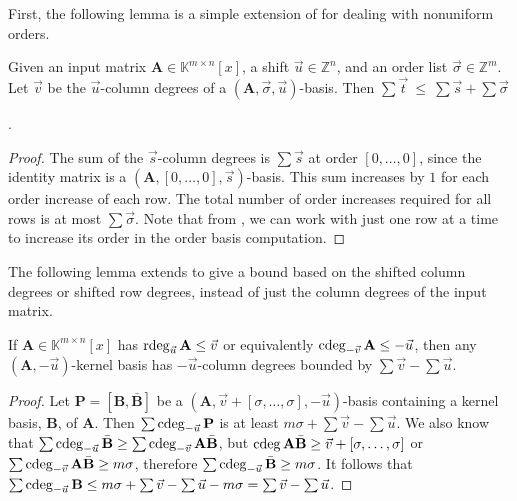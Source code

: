First, the following lemma is a simple extension of 
for dealing with nonuniform orders.
\begin{lem}
\label{lem:boundOfSumOfShiftedDegreesOfOrderBasisWithNonuniformOrder}Given
an input matrix $\mathbf{A}\in\mathbb{K}^{m\times n}[x]$, a shift
$\vec{u}\in\mathbb{Z}^{n}$, and an order list $\vec{\sigma}\in\mathbb{Z}^{m}$.
Let $\vec{v}$ be the $\vec{u}$-column degrees of a $\left(\mathbf{A},\vec{\sigma},\vec{u}\right)$-basis.
Then $\sum\vec{t}~\le~\sum\vec{s}+\sum\vec{\sigma}$%
\begin{comment}
 and $\max_{i}\left(\vec{t}_{i}-\vec{s}_{i}\right)\le\sigma$
\end{comment}
\textup{}%
\begin{comment}
need to permute the columns to put the pivots on the diagonal.
\end{comment}
. \end{lem}
\begin{proof}
\begin{comment}
For example, for a input matrix with two rows, instead of increasing
the order of both rows to $\left[1,1\right]$ at once, we can work
on the second row first to increase the order to $\left[0,1\right]$,
and then compute to order $\left[1,1\right]$.  
\end{comment}
The sum of the $\vec{s}$-column degrees is $\sum\vec{s}$ at order
$\left[0,\dots,0\right]$, since the identity matrix is a $\left(\mathbf{A},\left[0,\dots,0\right],\vec{s}\right)$-basis.
This sum increases by $1$ for each order increase of each row. The
total number of order increases required for all rows is at most $\sum\vec{\sigma}$.
Note that from , we can work with
just one row at a time to increase its order in the order basis computation. 
\end{proof}
The following lemma extends 
to give a bound based on the shifted column degrees or shifted row
degrees, instead of just the column degrees of the input matrix.
\begin{lem}
\label{lem:generaKernelBasisDegreeBound}If $\mathbf{A}\in\mathbb{K}^{m\times n}[x]$
has $\rdeg_{\vec{u}}\mathbf{A}\le\vec{v}$ or equivalently $\cdeg_{-\vec{v}}\mathbf{A}\le-\vec{u}$,
then any $(\mathbf{A},-\vec{u})$-kernel basis has $-\vec{u}$-column
degrees bounded by $\sum\vec{v}-\sum\vec{u}$. \end{lem}
\begin{proof}
Let $\mathbf{P}=\left[\mathbf{B},\bar{\mathbf{B}}\right]$ be a $\left(\mathbf{A},\vec{v}+\left[\sigma,\dots,\sigma\right],-\vec{u}\right)$-basis
containing a kernel basis, $\mathbf{B}$, of $\mathbf{A}$. Then $\sum\cdeg_{-\vec{u}}\mathbf{P}$
is at least $m\sigma+\sum\vec{v}-\sum\vec{u}$. We also know that
$\sum\cdeg_{-\vec{u}}\bar{\mathbf{B}}\ge\sum\cdeg_{-\vec{v}}\mathbf{A}\bar{\mathbf{B}}$,
but $\cdeg\mathbf{A}\bar{\mathbf{B}}\ge\vec{v}+\left[\sigma,\dots,\sigma\right]$
or $\sum\cdeg_{-\vec{v}}\mathbf{A}\bar{\mathbf{B}}\ge m\sigma$, therefore
$\sum\cdeg_{-\vec{u}}\bar{\mathbf{B}}\ge m\sigma$. It follows that
$\sum\cdeg_{-\vec{u}}\mathbf{B}\le m\sigma+\sum\vec{v}-\sum\vec{u}-m\sigma=\sum\vec{v}-\sum\vec{u}$.
\end{proof}
